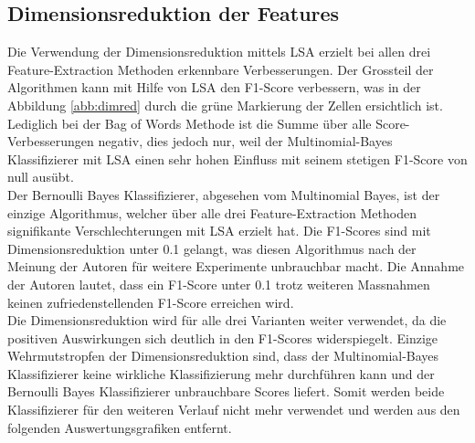 \subsection{Dimensionsreduktion der Features}
Die Verwendung der Dimensionsreduktion mittels LSA erzielt bei allen drei Feature-Extraction Methoden erkennbare Verbesserungen.
Der Grossteil der Algorithmen kann mit Hilfe von LSA den F1-Score verbessern, was in der Abbildung \cref{abb:dimred} durch die grüne Markierung der Zellen ersichtlich ist.
Lediglich bei der \glqq Bag of Words\grqq{} Methode ist die Summe über alle Score-Verbesserungen negativ, dies jedoch nur, weil der Multinomial-Bayes Klassifizierer mit LSA einen sehr hohen Einfluss mit seinem stetigen F1-Score von null ausübt.\\
Der Bernoulli Bayes Klassifizierer, abgesehen vom Multinomial Bayes, ist der einzige Algorithmus, welcher über alle drei Feature-Extraction Methoden signifikante Verschlechterungen mit LSA erzielt hat. Die F1-Scores sind mit Dimensionsreduktion unter 0.1 gelangt, was diesen Algorithmus nach der Meinung der Autoren für weitere Experimente unbrauchbar macht. Die Annahme der Autoren lautet, dass ein F1-Score unter 0.1 trotz weiteren Massnahmen keinen zufriedenstellenden F1-Score erreichen wird.\\
Die Dimensionsreduktion wird für alle drei Varianten weiter verwendet, da die positiven Auswirkungen sich deutlich in den F1-Scores widerspiegelt.
Einzige Wehrmutstropfen der Dimensionsreduktion sind, dass der Multinomial-Bayes Klassifizierer keine wirkliche Klassifizierung mehr durchführen kann und der Bernoulli Bayes Klassifizierer unbrauchbare Scores liefert.
Somit werden beide Klassifizierer für den weiteren Verlauf nicht mehr verwendet und werden aus den folgenden Auswertungsgrafiken entfernt.
